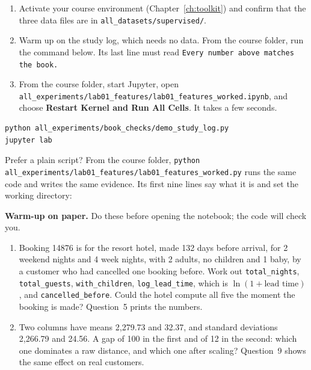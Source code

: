 \begin{labmode}
\begin{enumerate}
  \item Activate your course environment (Chapter~\ref{ch:toolkit}) and confirm that the three data files are in \texttt{all\_datasets/\allowbreak supervised/}.
  \item Warm up on the study log, which needs no data. From the course folder, run the command below. Its last line must read \texttt{Every number above matches the book.}
  \item From the course folder, start Jupyter, open \texttt{all\_experiments/\allowbreak lab01\_features/\allowbreak lab01\_features\_worked.ipynb}, and choose \textbf{Restart Kernel and Run All Cells}. It takes a few seconds.
\end{enumerate}
\begin{lstlisting}[style=utpterminal]
python all_experiments/book_checks/demo_study_log.py
jupyter lab
\end{lstlisting}
Prefer a plain script? From the course folder, \texttt{python all\_experiments/\allowbreak lab01\_features/\allowbreak lab01\_features\_worked.py} runs the same code and writes the same evidence. Its first nine lines say what it is and set the working directory:

\end{labmode}

\labroutine

\begin{yourturn}
\textbf{Warm-up on paper.} Do these before opening the notebook; the code will check you.
\begin{enumerate}
  \item Booking 14876 is for the resort hotel, made 132 days before arrival, for 2 weekend nights and 4 week nights, with 2 adults, no children and 1 baby, by a customer who had cancelled one booking before. Work out \texttt{total\_nights}, \texttt{total\_guests}, \texttt{with\_children}, \texttt{log\_lead\_time}, which is $\ln(1+\text{lead time})$, and \texttt{cancelled\_before}. Could the hotel compute all five the moment the booking is made? Question~5 prints the numbers.
  \item Two columns have means 2,279.73 and 32.37, and standard deviations 2,266.79 and 24.56. A gap of 100 in the first and of 12 in the second: which one dominates a raw distance, and which one after scaling? Question~9 shows the same effect on real customers.
\end{enumerate}
\end{yourturn}

